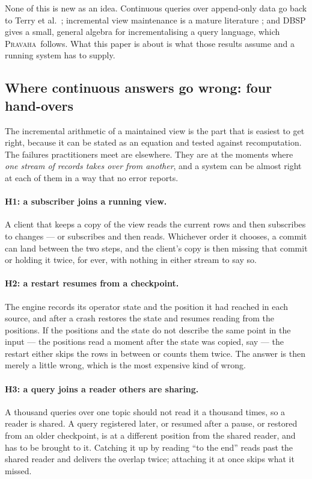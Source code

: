 \documentclass[11pt,a4paper]{article}
\renewcommand{\_}{\oldunderscore\allowbreak}
\newcommand{\Pv}{\textsc{Pravaha}}
\begin{document}
None of this is new as an idea. Continuous queries over append-only data go back to Terry et
al.~\cite{terry1992}; incremental view maintenance is a mature literature
\cite{blakeley1986,gupta1995,griffin1995,koch2010,dbtoaster2012}; and DBSP \cite{dbsp2023} gives
a small, general algebra for incrementalising a query language, which \Pv\ follows. What this paper
is about is what those results assume and a running system has to supply.

\subsection{Where continuous answers go wrong: four hand-overs}

The incremental arithmetic of a maintained view is the part that is easiest to get right, because it
can be stated as an equation and tested against recomputation. The failures practitioners meet are
elsewhere. They are at the moments where \emph{one stream of records takes over from another}, and
a system can be almost right at each of them in a way that no error reports.

\paragraph{H1: a subscriber joins a running view.} A client that keeps a copy of the view reads the
current rows and then subscribes to changes --- or subscribes and then reads. Whichever order it
chooses, a commit can land between the two steps, and the client's copy is then missing that commit
or holding it twice, for ever, with nothing in either stream to say so.

\paragraph{H2: a restart resumes from a checkpoint.} The engine records its operator state and the
position it had reached in each source, and after a crash restores the state and resumes reading
from the positions. If the positions and the state do not describe the same point in the input ---
the positions read a moment after the state was copied, say --- the restart either skips the rows in
between or counts them twice. The answer is then merely a little wrong, which is the most expensive
kind of wrong.

\paragraph{H3: a query joins a reader others are sharing.} A thousand queries over one topic should
not read it a thousand times, so a reader is shared. A query registered later, or resumed after a
pause, or restored from an older checkpoint, is at a different position from the shared reader, and
has to be brought to it. Catching it up by reading ``to the end'' reads past the shared reader and
delivers the overlap twice; attaching it at once skips what it missed.
\end{document}
